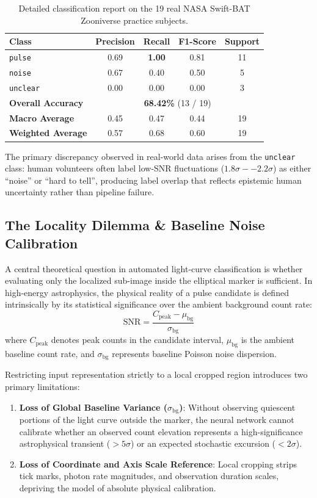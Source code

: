 \documentclass[10pt,twocolumn]{article}
\begin{document}
\begin{table}[h]
\centering
\caption{Detailed classification report on the 19 real NASA Swift-BAT Zooniverse practice subjects.}
\label{tab:real_zooniverse}
\begin{tabular}{lcccc}
\toprule
\textbf{Class} & \textbf{Precision} & \textbf{Recall} & \textbf{F1-Score} & \textbf{Support} \\
\midrule
\texttt{pulse}   & 0.69 & \textbf{1.00} & 0.81 & 11 \\
\texttt{noise}   & 0.67 & 0.40 & 0.50 & 5 \\
\texttt{unclear} & 0.00 & 0.00 & 0.00 & 3 \\
\midrule
\textbf{Overall Accuracy} & \multicolumn{4}{c}{\textbf{68.42\%} (13 / 19)} \\
\textbf{Macro Average}    & 0.45 & 0.47 & 0.44 & 19 \\
\textbf{Weighted Average} & 0.57 & 0.68 & 0.60 & 19 \\
\bottomrule
\end{tabular}
\end{table}

The primary discrepancy observed in real-world data arises from the \texttt{unclear} class: human volunteers often label low-SNR fluctuations ($1.8\sigma--2.2\sigma$) as either ``noise'' or ``hard to tell'', producing label overlap that reflects epistemic human uncertainty rather than pipeline failure.

\subsection{The Locality Dilemma \& Baseline Noise Calibration}
A central theoretical question in automated light-curve classification is whether evaluating only the localized sub-image inside the elliptical marker is sufficient. In high-energy astrophysics, the physical reality of a pulse candidate is defined intrinsically by its statistical significance over the ambient background count rate:
\begin{equation}
    \text{SNR} = \frac{C_{\text{peak}} - \mu_{\text{bg}}}{\sigma_{\text{bg}}}
\end{equation}
where $C_{\text{peak}}$ denotes peak counts in the candidate interval, $\mu_{\text{bg}}$ is the ambient baseline count rate, and $\sigma_{\text{bg}}$ represents baseline Poisson noise dispersion.

Restricting input representation strictly to a local cropped region introduces two primary limitations:
\begin{enumerate}
    \item \textbf{Loss of Global Baseline Variance ($\sigma_{\text{bg}}$)}: Without observing quiescent portions of the light curve outside the marker, the neural network cannot calibrate whether an observed count elevation represents a high-significance astrophysical transient ($>5\sigma$) or an expected stochastic excursion ($<2\sigma$).
    \item \textbf{Loss of Coordinate and Axis Scale Reference}: Local cropping strips tick marks, photon rate magnitudes, and observation duration scales, depriving the model of absolute physical calibration.
\end{enumerate}
\end{document}
